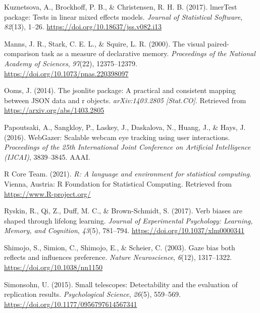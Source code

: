 \documentclass[
  man,floatsintext]{apa6}
\newlength{\cslhangindent}
\newlength{\cslentryspacingunit} %
\newenvironment{CSLReferences}[2] %
 {%
  \setlength{\parindent}{0pt}
  \ifodd #1
  \let\oldpar\par
  \def\par{\hangindent=\cslhangindent\oldpar}
  \fi
  \setlength{\parskip}{#2\cslentryspacingunit}
 }%
 {}
\begin{document}
\begin{CSLReferences}{1}{0}
\leavevmode{}%
Kuznetsova, A., Brockhoff, P. B., \& Christensen, R. H. B. (2017). {lmerTest} package: Tests in linear mixed effects models. \emph{Journal of Statistical Software}, \emph{82}(13), 1--26. \url{https://doi.org/10.18637/jss.v082.i13}

\leavevmode{}%
Manns, J. R., Stark, C. E. L., \& Squire, L. R. (2000). The visual paired-comparison task as a measure of declarative memory. \emph{Proceedings of the National Academy of Sciences}, \emph{97}(22), 12375--12379. \url{https://doi.org/10.1073/pnas.220398097}

\leavevmode{}%
Ooms, J. (2014). The jsonlite package: A practical and consistent mapping between JSON data and r objects. \emph{arXiv:1403.2805 {[}Stat.CO{]}}. Retrieved from \url{https://arxiv.org/abs/1403.2805}

\leavevmode{}%
Papoutsaki, A., Sangkloy, P., Laskey, J., Daskalova, N., Huang, J., \& Hays, J. (2016). {WebGazer}: {Scalable} webcam eye tracking using user interactions. \emph{Proceedings of the 25th International Joint Conference on Artificial Intelligence ({IJCAI})}, 3839--3845. {AAAI}.

\leavevmode{}%
R Core Team. (2021). \emph{R: A language and environment for statistical computing}. Vienna, Austria: R Foundation for Statistical Computing. Retrieved from \url{https://www.R-project.org/}

\leavevmode{}%
Ryskin, R., Qi, Z., Duff, M. C., \& Brown-Schmidt, S. (2017). Verb biases are shaped through lifelong learning. \emph{Journal of Experimental Psychology: Learning, Memory, and Cognition}, \emph{43}(5), 781--794. \url{https://doi.org/10.1037/xlm0000341}

\leavevmode{}%
Shimojo, S., Simion, C., Shimojo, E., \& Scheier, C. (2003). Gaze bias both reflects and influences preference. \emph{Nature Neuroscience}, \emph{6}(12), 1317--1322. \url{https://doi.org/10.1038/nn1150}

\leavevmode{}%
Simonsohn, U. (2015). Small telescopes: Detectability and the evaluation of replication results. \emph{Psychological Science}, \emph{26}(5), 559--569. \url{https://doi.org/10.1177/0956797614567341}


\end{CSLReferences}
\end{document}

